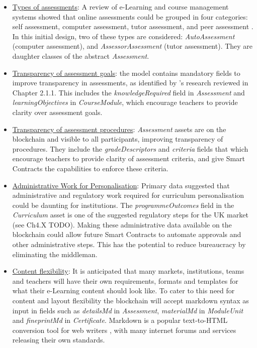 \begin{itemize}
	\setlength\itemsep{0em}
	\item \underline{Types of assessments}: A review of e-Learning and course management systems showed that online assessments could be
	      grouped in four categories: self assessment, computer assessment, tutor assessment, and peer assessment
	      \citep[p.68]{paulsen2004online}. In this initial design, two of these types are considered: \textit{AutoAssessment} (computer
	      assessment), and \textit{AssessorAssessment} (tutor assessment). They are daughter classes of the abstract \textit{Assessment}.
	\item \underline{Transparency of assessment goals}: the model contains mandatory fields to improve transparency in assessments, as identified by
	      \citet{suhre2013determinants}'s research reviewed in Chapter 2.1.1. This includes the \textit{knowledgeRequired} field
	      in \textit{Assessment} and \textit{learningObjectives} in \textit{CourseModule}, which encourage teachers to provide
	      clarity over assessment goals.
	\item \underline{Transparency of assessment procedures}: \textit{Assessment} assets are on the blockchain and visible to all participants,
	      improving transparency of procedures.
	      They include the \textit{gradeDescriptors} and \textit{criteria} fields that which encourage teachers to provide clarity of
	      assessment criteria, and give Smart Contracts the capabilities to enforce these criteria.
	\item \underline{Administrative Work for Personalisation}: Primary data suggested that administrative and regulatory work required for
	      curriculum personalisation could be daunting for institutions. The \textit{programmeOutcomes} field in the \textit{Curriculum} asset is one of
	      the suggested regulatory steps for the UK market (see Ch4.X TODO). Making these administrative data available on the blockchain
	      could allow future Smart Contracts to automate approvals and other administrative steps. This has the potential to reduce
	      bureaucracy by eliminating the middleman.
	\item \underline{Content flexibility}: It is anticipated that many markets, institutions, teams and teachers
	      will have their own requirements, formats and templates for what their e-Learning content should look like. To cater to
	      this need for content and layout flexibility the blockchain will accept markdown syntax as input in fields such as
	      \textit{detailsMd} in \textit{Assessment}, \textit{materialMd} in \textit{ModuleUnit} and \textit{fineprintMd} in \textit{Certificate}.
	      Markdown is a popular text-to-HTML conversion tool for web writers \citep{gruber2004markdown}, with many internet forums and
	      services releasing their own standards.
\end{itemize}

